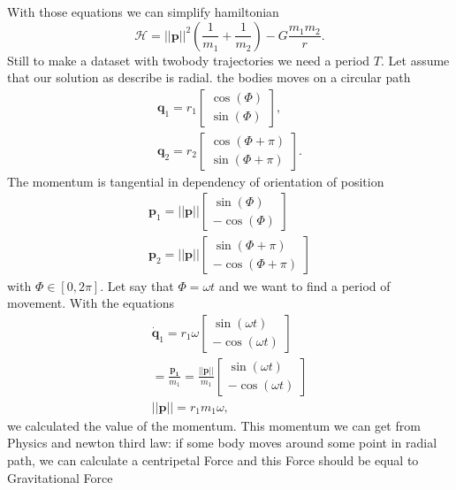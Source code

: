 With those equations we can simplify hamiltonian \begin{equation}
	\mathcal{H}= ||\mathbf{p}||^2\left(\frac{1}{m_1}+\frac{1}{m_2}\right) - G\frac{m_1m_2}{r}.
\end{equation}
Still to make a dataset with twobody trajectories we need a period $T$. Let assume that our solution as describe is radial. the bodies moves on a circular path
\begin{eqnarray}
	\mathbf{q}_1 = r_1
	\begin{bmatrix}
		\cos(\Phi)\\
		\sin(\Phi)
	\end{bmatrix},\\
\mathbf{q}_2 = r_2
\begin{bmatrix}
	\cos(\Phi+ \pi)\\
	\sin(\Phi+ \pi)
\end{bmatrix}.
\end{eqnarray}
The momentum is tangential in dependency of orientation of position
\begin{eqnarray}
	\mathbf{p}_1 = ||\mathbf{p}||
	\begin{bmatrix}
		\sin(\Phi)\\
		-\cos(\Phi)
	\end{bmatrix}\\
	\mathbf{p}_2 = ||\mathbf{p}||
	\begin{bmatrix}
		\sin(\Phi+ \pi)\\
		-\cos(\Phi+ \pi)
	\end{bmatrix}
\end{eqnarray} with $\Phi \in [0,2\pi] $.
Let say that $\Phi=\omega t$
and we want to find a period of movement.
With the equations
\begin{eqnarray}
	\dot{\mathbf{q}}_1 = r_1\omega
	\begin{bmatrix}
		\sin(\omega t)\\
		-\cos(\omega t)
	\end{bmatrix}\\ = \frac{\mathbf{p_1}}{m_1} = \frac{||\mathbf{p}||}{m_1}\begin{bmatrix}
	\sin(\omega t)\\
	-\cos(\omega t)
\end{bmatrix}\\
||\mathbf{p}|| = r_1m_1\omega,
\end{eqnarray}
we calculated the value of the momentum.
This momentum we can get from Physics and newton third law: if some body moves around some point in radial path, we can calculate a centripetal Force and this Force should be equal to Gravitational Force
